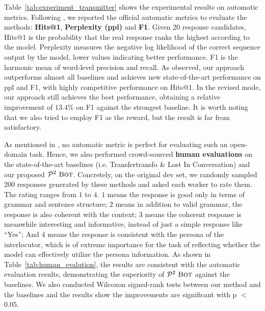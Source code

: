 \documentclass[11pt,a4paper]{article}
\begin{document}
Table~\ref{tab:experiment_transmitter} shows the experimental results on automatic metrics. Following \citet{zhang2018personalizing}, we reported the official automatic metrics to evaluate the methods: \textbf{Hits@1}, \textbf{Perplexity (ppl)} and \textbf{F1}. Given 20 response candidates, Hits@1 is the probability that the real response ranks the highest according to the model. Perplexity measures the negative log likelihood of the correct sequence output by the model, lower values indicating better performance. F1 is the harmonic mean of word-level precision and recall. As observed, our approach outperforms almost all baselines and achieves new state-of-the-art performance on ppl and F1, with highly competitive performance on Hits@1. In the revised mode, our approach still achieves the best performance, obtaining a relative improvement of $13.4\%$ on F1 against the strongest baseline. It is worth noting that we also tried to employ F1 as the reward, but the result is far from satisfactory. 

As mentioned in \citet{dinan2019second}, no automatic metric is perfect for evaluating such an open-domain task. Hence, we also performed crowd-sourced \textbf{human evaluations} on the state-of-the-art baselines (i.e. Transfertransfo \& Lost In Conversation) and our proposed $\mathcal{P}^2~\textsc{Bot}$. Concretely, on the original dev set, we randomly sampled 200 responses generated by these methods and asked each worker to rate them. The rating ranges from $1$ to $4$. $1$ means the response is good only in terms of grammar and sentence structure; $2$ means in addition to valid grammar, the response is also coherent with the context; $3$ means the coherent response is meanwhile interesting and informative, instead of just a simple response like “Yes”; And $4$ means the response is consistent with the persona of the interlocutor, which is of extreme importance for the task of reflecting whether the model can effectively utilize the persona information. 
As shown in Table~\ref{tab:human_evalution}, the results are consistent with the automatic evaluation results, demonstrating the superiority of $\mathcal{P}^2~\textsc{Bot}$ against the baselines. We also conducted Wilcoxon signed-rank tests between our method and the baselines and the results show the improvements are significant with p $<$ $0.05$.
\end{document}
